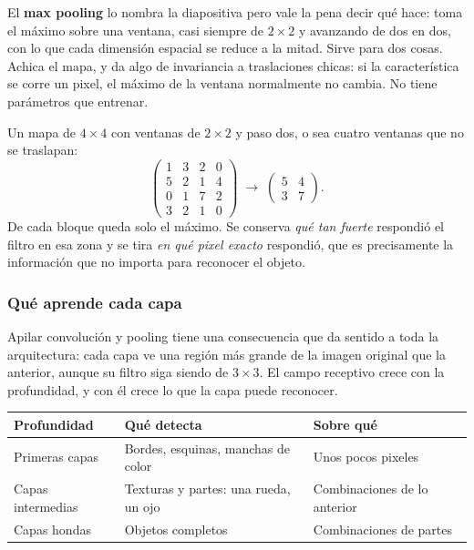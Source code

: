 \documentclass[11pt,letterpaper]{article}
\begin{document}
El \textbf{max pooling} lo nombra la diapositiva pero vale la pena
decir qué hace: toma el máximo sobre una ventana, casi siempre de
$2 \times 2$ y avanzando de dos en dos, con lo que cada dimensión
espacial se reduce a la mitad. Sirve para dos cosas. Achica el mapa, y
da algo de invariancia a traslaciones chicas: si la característica se
corre un pixel, el máximo de la ventana normalmente no cambia. No
tiene parámetros que entrenar.

\begin{ejemplo}
  Un mapa de $4 \times 4$ con ventanas de $2 \times 2$ y paso dos, o
  sea cuatro ventanas que no se traslapan:
  \[
    \begin{pmatrix}
      1 & 3 & 2 & 0 \\
      5 & 2 & 1 & 4 \\
      0 & 1 & 7 & 2 \\
      3 & 2 & 1 & 0
    \end{pmatrix}
    \;\longrightarrow\;
    \begin{pmatrix} 5 & 4 \\ 3 & 7 \end{pmatrix} .
  \]
  De cada bloque queda solo el máximo. Se conserva \emph{qué tan
  fuerte} respondió el filtro en esa zona y se tira \emph{en qué
  pixel exacto} respondió, que es precisamente la información que no
  importa para reconocer el objeto.
\end{ejemplo}

\subsubsection*{Qué aprende cada capa}

Apilar convolución y pooling tiene una consecuencia que da sentido a
toda la arquitectura: cada capa ve una región más grande de la imagen
original que la anterior, aunque su filtro siga siendo de
$3 \times 3$. El campo receptivo crece con la profundidad, y con él
crece lo que la capa puede reconocer.

\begin{center}
\begin{tabular}{>{\raggedright\arraybackslash}p{2.9cm}
                >{\raggedright\arraybackslash}p{4.4cm}
                >{\raggedright\arraybackslash}p{5.7cm}}
  \toprule
  \textbf{Profundidad} & \textbf{Qué detecta} & \textbf{Sobre qué} \\
  \midrule
  Primeras capas & Bordes, esquinas, manchas de color &
  Unos pocos pixeles \\
  \addlinespace
  Capas intermedias & Texturas y partes: una rueda, un ojo &
  Combinaciones de lo anterior \\
  \addlinespace
  Capas hondas & Objetos completos &
  Combinaciones de partes \\
  \bottomrule
\end{tabular}
\end{center}
\end{document}
